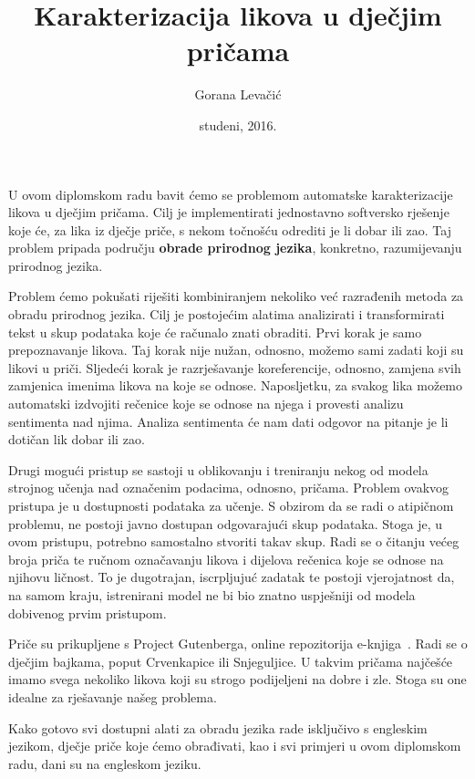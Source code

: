 \documentclass[a4paper,twoside,12pt]{memoir} %
\title{Karakterizacija likova u dje\v cjim pri\v cama}
\author{Gorana Levačić}
\date{studeni, 2016.}  %
\begin{document}
	\frontmatter

	\begin{intro}


		U ovom diplomskom radu bavit ćemo se problemom automatske karakterizacije likova u dječjim pričama. Cilj je implementirati jednostavno softversko rješenje koje će, za lika iz dječje priče, s nekom točnošću odrediti je li dobar ili zao. Taj problem pripada području \textbf{obrade prirodnog jezika}, konkretno, razumijevanju prirodnog jezika.

		Problem ćemo pokušati riješiti kombiniranjem nekoliko već razrađenih metoda za obradu prirodnog jezika. Cilj je postojećim alatima analizirati i transformirati tekst u skup podataka koje će računalo znati obraditi. Prvi korak je samo prepoznavanje likova. Taj korak nije nužan, odnosno, možemo sami zadati koji su likovi u priči. Sljedeći korak je razrješavanje koreferencije, odnosno, zamjena svih zamjenica imenima likova na koje se odnose. Naposljetku, za svakog lika možemo automatski izdvojiti rečenice koje se odnose na njega i provesti analizu sentimenta nad njima. Analiza sentimenta će nam dati odgovor na pitanje je li dotičan lik dobar ili zao.

		Drugi mogući pristup se sastoji u oblikovanju i treniranju nekog od modela strojnog učenja nad označenim podacima, odnosno, pričama. Problem ovakvog pristupa je u dostupnosti podataka za učenje. S obzirom da se radi o atipičnom problemu, ne postoji javno dostupan odgovarajući skup podataka. Stoga je, u ovom pristupu, potrebno samostalno stvoriti takav skup. Radi se o čitanju većeg broja priča te ručnom označavanju likova i dijelova rečenica koje se odnose na njihovu ličnost. To je dugotrajan, iscrpljujuć zadatak te postoji vjerojatnost da, na samom kraju, istrenirani model ne bi bio znatno uspješniji od modela dobivenog prvim pristupom.

		Priče su prikupljene s Project Gutenberga, online repozitorija e-knjiga~\cite{gutenberg}. Radi se o dječjim bajkama, poput Crvenkapice ili Snjeguljice. U takvim pričama najčešće imamo svega nekoliko likova koji su strogo podijeljeni na dobre i zle. Stoga su one idealne za rješavanje našeg problema.

		Kako gotovo svi dostupni alati za obradu jezika rade isključivo s engleskim jezikom, dječje priče koje ćemo obrađivati, kao i svi primjeri u ovom diplomskom radu, dani su na engleskom jeziku.

	\end{intro}
\end{document}
